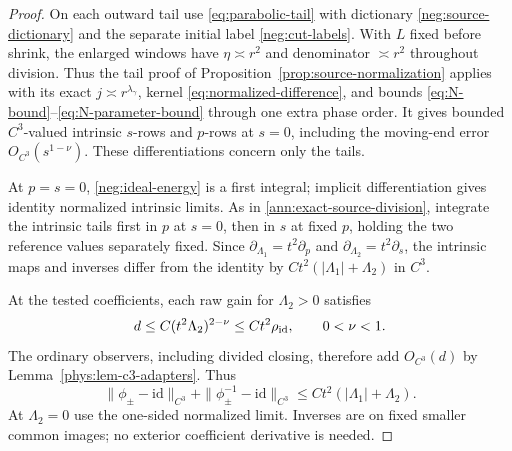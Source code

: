 \begin{proof}
On each outward tail use \eqref{eq:parabolic-tail} with dictionary
\eqref{neg:source-dictionary} and the separate initial label
\eqref{neg:cut-labels}. With \(L\) fixed before shrink, the enlarged
windows have \(\eta\asymp r^2\) and denominator \(\asymp r^2\)
throughout division. Thus the tail proof of
Proposition~\ref{prop:source-normalization} applies with its exact
\(j\asymp r^{\lambda_\gamma}\), kernel
\eqref{eq:normalized-difference}, and bounds
\eqref{eq:N-bound}--\eqref{eq:N-parameter-bound} through one extra
phase order. It gives bounded \(C^3\)-valued intrinsic \(s\)-rows
and \(p\)-rows at \(s=0\), including the moving-end error
\(O_{C^3}(s^{1-\nu})\). These differentiations concern only the tails.

At \(p=s=0\), \eqref{neg:ideal-energy} is a first integral;
implicit differentiation gives identity normalized intrinsic limits.
As in \eqref{ann:exact-source-division}, integrate the intrinsic tails
first in \(p\) at \(s=0\), then in \(s\) at fixed \(p\), holding
the two reference values separately fixed. Since
\(\partial_{\Lambda_1}=t^2\partial_p\)
and \(\partial_{\Lambda_2}=t^2\partial_s\), the intrinsic maps and
inverses differ from the identity by
\(Ct^2(|\Lambda_1|+\Lambda_2)\) in \(C^3\).

At the tested coefficients, each raw gain for \(\Lambda_2>0\) satisfies
\[
 d\le C(t^2\Lambda_2)^{2-\nu}
       \le Ct^2\rho_{\rm id},\qquad 0<\nu<1.
\]
The ordinary observers, including divided closing, therefore add
\(O_{C^3}(d)\) by Lemma~\ref{phys:lem-c3-adapters}. Thus
\begin{equation}\label{neg:single-tail-estimate}
 \|\phi_\pm-\mathrm{id}\|_{C^3}
 +\|\phi_\pm^{-1}-\mathrm{id}\|_{C^3}
       \le Ct^2(|\Lambda_1|+\Lambda_2).
\end{equation}
At \(\Lambda_2=0\) use the one-sided normalized limit. Inverses
are on fixed smaller common images; no exterior coefficient derivative
is needed.


\end{proof}
